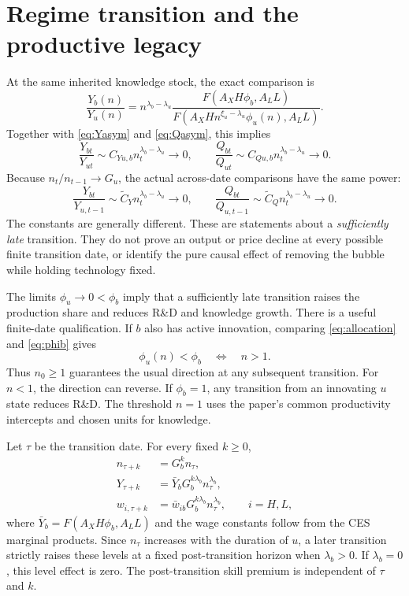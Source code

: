 \documentclass[11pt,a4paper]{article}
\newcommand{\asym}{\sim}
\begin{document}
\section{Regime transition and the productive legacy}
At the same inherited knowledge stock, the exact comparison is
\begin{equation}
\frac{Y_b(n)}{Y_u(n)}
=n^{\lambda_b-\lambda_u}
\frac{F(A_XH\phi_b,A_LL)}{F(A_XHn^{\xi_u-\lambda_u}\phi_u(n),A_LL)}.
\end{equation}
Together with \eqref{eq:Yasym} and \eqref{eq:Qasym}, this implies
\begin{equation}
\frac{Y_{bt}}{Y_{ut}}\asym C_{Yu,b}n_t^{\lambda_b-\lambda_u}\to0,
\qquad
\frac{Q_{bt}}{Q_{ut}}\asym C_{Qu,b}n_t^{\lambda_b-\lambda_u}\to0.
\end{equation}
Because $n_t/n_{t-1}\to G_u$, the actual across-date comparisons have the
same power:
\begin{equation}
\boxed{\frac{Y_{bt}}{Y_{u,t-1}}\asym\widetilde C_Y n_t^{\lambda_b-\lambda_u}\to0,
\qquad
\frac{Q_{bt}}{Q_{u,t-1}}\asym\widetilde C_Q n_t^{\lambda_b-\lambda_u}\to0.}
\label{eq:crash}
\end{equation}
The constants are generally different. These are statements about a
\emph{sufficiently late} transition. They do not prove an output or price decline
at every possible finite transition date, or identify the pure causal effect of
removing the bubble while holding technology fixed.

The limits $\phi_u\to0<\phi_b$ imply that a sufficiently late transition raises
the production share and reduces R\&D and knowledge growth. There is a useful
finite-date qualification. If $b$ also has active innovation, comparing
\eqref{eq:allocation} and \eqref{eq:phib} gives
\begin{equation}
\phi_u(n)<\phi_b\quad\Longleftrightarrow\quad n>1.
\end{equation}
Thus $n_0\geq1$ guarantees the usual direction at any subsequent transition.
For $n<1$, the direction can reverse. If $\phi_b=1$, any transition from an
innovating $u$ state reduces R\&D. The threshold $n=1$ uses the paper's common
productivity intercepts and chosen units for knowledge.

Let $\tau$ be the transition date. For every fixed $k\geq0$,
\begin{align}
n_{\tau+k}&=G_b^k n_\tau,\\
Y_{\tau+k}&=\bar Y_b G_b^{k\lambda_b}n_\tau^{\lambda_b},\label{eq:legacy}\\
w_{i,\tau+k}&=\bar w_{ib}G_b^{k\lambda_b}n_\tau^{\lambda_b},\qquad i=H,L,
\end{align}
where $\bar Y_b=F(A_XH\phi_b,A_LL)$ and the wage constants follow from
the CES marginal products. Since $n_\tau$ increases with the duration of $u$,
a later transition strictly raises these levels at a fixed post-transition
horizon when $\lambda_b>0$. If $\lambda_b=0$, this level effect is zero.
The post-transition skill premium is independent of $\tau$ and $k$.
\end{document}

